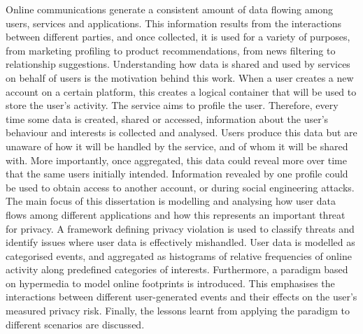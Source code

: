Online communications generate a consistent amount of data
flowing among users, services and applications. This
information results from the interactions between different
parties, and once collected, it is used for a variety of
purposes, from marketing profiling to product recommendations,
from news filtering to relationship suggestions.
Understanding how data is shared and used by services on behalf
of users is the motivation behind this work. When a user creates
a new account on a certain platform, this creates a logical
container that will be used to store the user's activity. The
service aims to profile the user. Therefore, every time some
data is created, shared or accessed, information about the
user’s behaviour and interests is collected and analysed. Users
produce this data but are unaware of how it will be handled by
the service, and of whom it will be shared with. More
importantly, once aggregated, this data could reveal more over
time that the same users initially intended. Information
revealed by one profile could be used to obtain access to
another account, or during social engineering attacks.
The main focus of this dissertation is modelling and analysing
how user data flows among different applications and how this
represents an important threat for privacy. A framework defining
privacy violation is used to classify threats and identify
issues where user data is effectively mishandled. User data is
modelled as categorised events, and aggregated as histograms of
relative frequencies of online activity along predefined
categories of interests. Furthermore, a paradigm based on
hypermedia to model online footprints is introduced. This
emphasises the interactions between different user-generated
events and their effects on the user’s measured privacy risk.
Finally, the lessons learnt from applying the paradigm to
different scenarios are discussed.